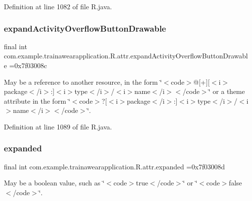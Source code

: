 Definition at line 1082 of file R.\+java.

\mbox{\label{classcom_1_1example_1_1trainawearapplication_1_1_r_1_1attr_ad129b8c044eb1bfe0878dcc87e52a6ff}} 
\subsubsection{\texorpdfstring{expandActivityOverflowButtonDrawable}{expandActivityOverflowButtonDrawable}}
{\footnotesize\ttfamily final int com.\+example.\+trainawearapplication.\+R.\+attr.\+expand\+Activity\+Overflow\+Button\+Drawable =0x7f03008c\hspace{0.3cm}{\ttfamily [static]}}

May be a reference to another resource, in the form \char`\"{}$<$code$>$@\mbox{[}+\mbox{]}\mbox{[}$<$i$>$package$<$/i$>$\+:\mbox{]}$<$i$>$type$<$/i$>$/$<$i$>$name$<$/i$>$$<$/code$>$\char`\"{} or a theme attribute in the form \char`\"{}$<$code$>$?\mbox{[}$<$i$>$package$<$/i$>$\+:\mbox{]}$<$i$>$type$<$/i$>$/$<$i$>$name$<$/i$>$$<$/code$>$\char`\"{}. 

Definition at line 1089 of file R.\+java.

\mbox{\label{classcom_1_1example_1_1trainawearapplication_1_1_r_1_1attr_abab3db116d5cf1dcdfc6608b62eb3257}} 
\subsubsection{\texorpdfstring{expanded}{expanded}}
{\footnotesize\ttfamily final int com.\+example.\+trainawearapplication.\+R.\+attr.\+expanded =0x7f03008d\hspace{0.3cm}{\ttfamily [static]}}

May be a boolean value, such as \char`\"{}$<$code$>$true$<$/code$>$\char`\"{} or \char`\"{}$<$code$>$false$<$/code$>$\char`\"{}. 

